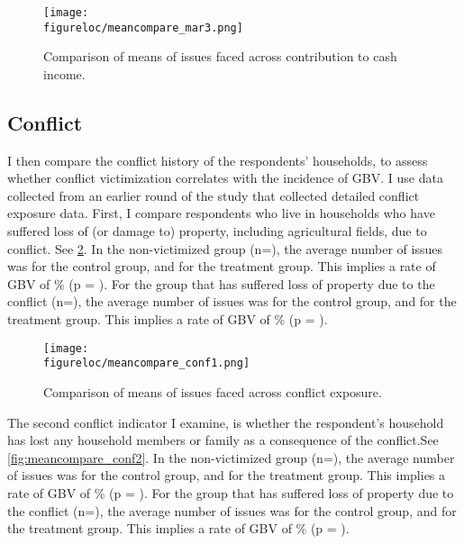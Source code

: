 \documentclass[11pt,a4paper]{scrartcl} %
\newcommand{\figureloc}{C:/Users/Koen/Dropbox/PhD/Papers/CongoGBV/Figures}
\begin{document}
\begin{figure}
  \texttt{[image: \\figureloc/meancompare\_mar3.png]}
  \caption{Comparison of means of issues faced across contribution to cash income.}
  \label{fig:meancompare_mar3}
\end{figure}


\subsection*{Conflict}
I then compare the conflict history of the respondents' households, to assess whether conflict victimization correlates with the incidence of GBV. I use data collected from an earlier round of the study that collected detailed conflict exposure data. First, I compare respondents who live in households who have suffered loss of (or damage to) property, including agricultural fields, due to conflict. See \ref{fig:meancompare_conf1}. In the non-victimized group (n=), the average number of issues was  for the control group, and  for the treatment group. This implies a rate of GBV of \% (p = ). For the group that has suffered loss of property due to the conflict (n=), the average number of issues was  for the control group, and  for the treatment group. This implies a rate of GBV of \% (p = ).

\begin{figure}
  \texttt{[image: \\figureloc/meancompare\_conf1.png]}
  \caption{Comparison of means of issues faced across conflict exposure.}
  \label{fig:meancompare_conf1}
\end{figure}

The second conflict indicator I examine, is whether the respondent's household has lost any household members or family as a consequence of the conflict.See \ref{fig:meancompare_conf2}. In the non-victimized group (n=), the average number of issues was  for the control group, and  for the treatment group. This implies a rate of GBV of \% (p = ). For the group that has suffered loss of property due to the conflict (n=), the average number of issues was  for the control group, and  for the treatment group. This implies a rate of GBV of \% (p = ).
\end{document}
